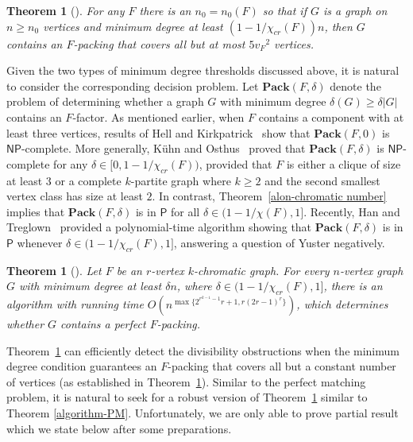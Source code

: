 \documentclass[11pt, letterpaper]{amsart}
\theoremstyle{plain}
\numberwithin{equation}{section}
\newtheorem{theorem}[thm]{Theorem}
\theoremstyle{definition}
\newcommand\card[1]{\left| #1 \right|}
\begin{document}
    
    \begin{theorem}[\cite{shokoufandeh2003proof}]\label{critical chromatic number-alomst pefect F-factor}
        For any $F$ there is an $n_0=n_0(F)$ so that if $G$ is a graph on $n\ge n_0$ vertices and minimum degree at least $\left(1-1/\chi_{cr}(F)\right)n$, then $G$ contains an $F$-packing that covers all but at most $5{v_F}^2$ vertices.
    \end{theorem}


    Given the two types of minimum degree thresholds discussed above, it is natural to consider the corresponding decision problem. 
    Let \(\mathbf{Pack}(F, \delta)\) denote the problem of determining whether a graph \(G\) with minimum degree \(\delta(G)\ge\delta \card{G}\) contains an \(F\)-factor. 
    As mentioned earlier, when \(F\) contains a component with at least three vertices, results of Hell and Kirkpatrick~\cite{kirkpatrick1983complexity} show that \(\mathbf{Pack}(F,0)\) is \(\mathsf{NP}\)-complete. 
    More generally, K\"{u}hn and Osthus~\cite{KuehnOsthus2006} proved that \(\mathbf{Pack}(F,\delta)\) is \(\mathsf{NP}\)-complete for any \(\delta \in [0,1-1/\chi_{cr}(F))\), provided that \(F\) is either a clique of size at least \(3\) or a complete \(k\)-partite graph where \(k\ge 2\) and the second smallest vertex class has size at least \(2\). 
    In contrast, Theorem~\ref{alon-chromatic number} implies that \(\mathbf{Pack}(F,\delta)\) is in \(\mathsf{P}\) for all \(\delta \in (1-1/\chi(F), 1]\). 
    Recently, Han and Treglown~\cite{han2020complexity} provided a polynomial-time algorithm showing that \(\mathbf{Pack}(F,\delta)\) is in \(\mathsf{P}\) whenever \(\delta \in (1 - 1/\chi_{cr}(F),1]\), answering a question of Yuster negatively.

    \begin{theorem}[\cite{han2020complexity}]\label{algorithm-factor}
        Let \(F\) be an \(r\)-vertex \(k\)-chromatic graph. For every \(n\)-vertex graph \(G\) with minimum degree at least \(\delta n\), where \(\delta\in (1-1/\chi_{cr}(F), 1]\), there is an algorithm with running time \(O\left(n^{\max \{2^{r^{k-1}-1}r+1, r(2r-1)^r\}}\right)\), which determines whether \(G\) contains a perfect \(F\)-packing.
    \end{theorem}

    Theorem~\ref{algorithm-factor} can efficiently detect the divisibility obstructions when the minimum degree condition guarantees an \(F\)-packing that covers all but a constant number of vertices (as established in Theorem~\ref{critical chromatic number-alomst pefect F-factor}). 
Similar to the perfect matching problem, it is natural to seek for a robust version of Theorem~\ref{algorithm-factor} similar to Theorem \ref{algorithm-PM}.
Unfortunately, we are only able to prove partial result which we state below after some preparations.
\end{document}
